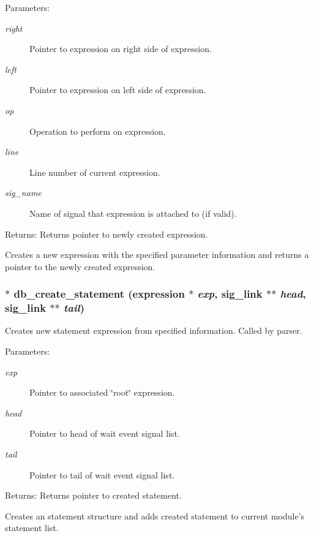 \begin{Desc}
\item[Parameters:]
\begin{description}
\item[{\em right}]Pointer to expression on right side of expression. \item[{\em left}]Pointer to expression on left side of expression. \item[{\em op}]Operation to perform on expression. \item[{\em line}]Line number of current expression. \item[{\em sig\_\-name}]Name of signal that expression is attached to (if valid).\end{description}
\end{Desc}
\begin{Desc}
\item[Returns:]Returns pointer to newly created expression.\end{Desc}
Creates a new expression with the specified parameter information and returns a pointer to the newly created expression. 
\subsubsection{$\ast$ db\_\-create\_\-statement ({\bf expression} $\ast$ {\em exp}, {\bf sig\_\-link} $\ast$$\ast$ {\em head}, {\bf sig\_\-link} $\ast$$\ast$ {\em tail})}\label{db_8c_a33}


Creates new statement expression from specified information. Called by parser. 

\begin{Desc}
\item[Parameters:]
\begin{description}
\item[{\em exp}]Pointer to associated \char`\"{}root\char`\"{} expression. \item[{\em head}]Pointer to head of wait event signal list. \item[{\em tail}]Pointer to tail of wait event signal list.\end{description}
\end{Desc}
\begin{Desc}
\item[Returns:]Returns pointer to created statement.\end{Desc}
Creates an statement structure and adds created statement to current module's statement list. 
